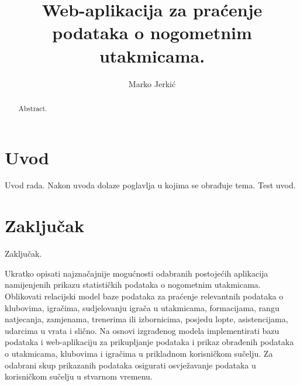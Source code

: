 \documentclass[times, utf8, zavrsni]{fer}
\begin{document}

\title{Web-aplikacija za praćenje podataka o nogometnim utakmicama.}

\author{Marko Jerkić}

\maketitle


\zahvala{}

\tableofcontents

\chapter{Uvod}
Uvod rada. Nakon uvoda dolaze poglavlja u kojima se obrađuje tema.
Test uvod.

\chapter{Zaključak}
Zaključak.




\begin{sazetak}
Ukratko opisati najznačajnije mogućnosti odabranih postojećih aplikacija namijenjenih prikazu statističkih
podataka o nogometnim utakmicama. Oblikovati relacijski model baze podataka za praćenje relevantnih
podataka o klubovima, igračima, sudjelovanju igrača u utakmicama, formacijama, rangu natjecanja,
zamjenama, trenerima ili izbornicima, posjedu lopte, asistencijama, udarcima u vrata i slično. Na osnovi
izgrađenog modela implementirati bazu podataka i web-aplikaciju za prikupljanje podataka i prikaz obrađenih
podataka o utakmicama, klubovima i igračima u prikladnom korisničkom sučelju. Za odabrani skup prikazanih
podataka osigurati osvježavanje podataka u korisničkom sučelju u stvarnom vremenu.

\end{sazetak}

\begin{abstract}
Abstract.

\end{abstract}
\end{document}
